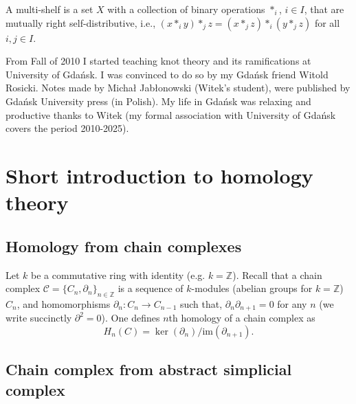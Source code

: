 \documentclass[12pt]{amsart}
\begin{document}
A multi-shelf is a set $X$ with a collection of binary operations $*_i$, $i\in I$, that are mutually right self-distributive, i.e., $(x*_iy)*_jz=(x*_jz)*_i(y*_jz)$ for all $i,j\in I$.

From Fall of 2010 I started teaching knot theory and its ramifications at University of Gda\'nsk. I was convinced to do so by my Gda\'nsk friend Witold Rosicki. 
Notes made by Micha{\l} Jab{\l}onowski (Witek's student), were published by Gda\'nsk University press \cite{Prz9} (in Polish). My life in Gda\'nsk was relaxing and productive thanks to  Witek (my formal association with University of Gda\'nsk covers the period 2010-2025).


\section{Short introduction to homology theory} 

\subsection{Homology from chain complexes}
Let $k$ be a commutative ring with identity (e.g. $k= \mathbb Z$). Recall that 
a chain complex 
$\mathcal C = \{C_n,\partial_n \}_{n\in \mathbb Z}$ 
is a sequence of 
$k$-modules (abelian groups for $k= \mathbb Z$) $C_n$, and homomorphisms $\partial_n: C_n \to C_{n-1}$ such that, $\partial_{n} \partial_{n+1} =0$ for any  $n$ (we write succinctly $\partial^2 = 0$). One defines $n$th homology of a chain complex as
\begin{equation*}
H_{n}(C)=\ker \left( \partial _{n}\right) /\mathrm{im}\left( \partial
_{n+1}\right).
\end{equation*}

\subsection{Chain complex from abstract simplicial complex}
\end{document}
